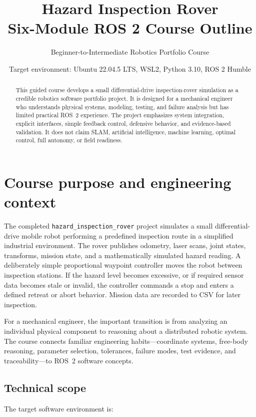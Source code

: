 \documentclass[11pt]{article}
\title{%
  \textcolor{RoverBlue}{\textbf{Hazard Inspection Rover}}\\[0.35em]
  \large Six-Module ROS 2 Course Outline
}
\author{Beginner-to-Intermediate Robotics Portfolio Course}
\date{Target environment: Ubuntu 22.04.5 LTS, WSL2, Python 3.10, ROS 2 Humble}
\newcommand{\projectname}{\texttt{hazard\_inspection\_rover}}
\begin{document}
\maketitle

\begin{abstract}
This guided course develops a small differential-drive inspection-rover
simulation as a credible robotics software portfolio project. It is designed
for a mechanical engineer who understands physical systems, modeling, testing,
and failure analysis but has limited practical ROS~2 experience. The project
emphasizes system integration, explicit interfaces, simple feedback control,
defensive behavior, and evidence-based validation. It does not claim SLAM,
artificial intelligence, machine learning, optimal control, full autonomy, or
field readiness.
\end{abstract}

\tableofcontents
\newpage

\section{Course purpose and engineering context}

The completed \projectname{} project simulates a small differential-drive
mobile robot performing a predefined inspection route in a simplified
industrial environment. The rover publishes odometry, laser scans, joint
states, transforms, mission state, and a mathematically simulated hazard
reading. A deliberately simple proportional waypoint controller moves the
robot between inspection stations. If the hazard level becomes excessive, or
if required sensor data becomes stale or invalid, the controller commands a
stop and enters a defined retreat or abort behavior. Mission data are recorded
to CSV for later inspection.

For a mechanical engineer, the important transition is from analyzing an
individual physical component to reasoning about a distributed robotic system.
The course connects familiar engineering habits---coordinate systems,
free-body reasoning, parameter selection, tolerances, failure modes, test
evidence, and traceability---to ROS~2 software concepts.

\subsection{Technical scope}

The target software environment is:
\end{document}

